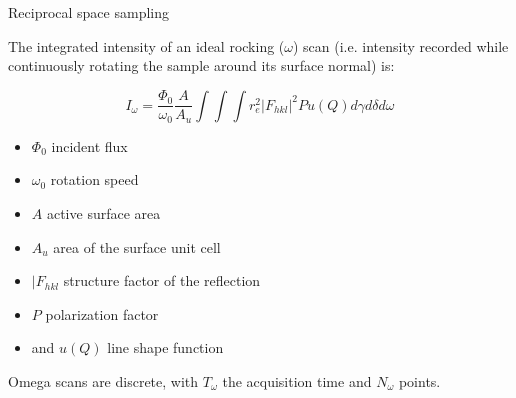 \begin{frame}{Reciprocal space sampling}

    The integrated intensity of an ideal rocking ($\omega$) scan (i.e. intensity recorded while continuously rotating the sample around its surface normal) is:
    
    \begin{equation}
        I_\omega = \frac{\Phi_0}{\omega_0} \frac{A}{A_u} \int \int \int r_e^2 |F_{hkl}|^2 P u(Q) d\gamma d\delta d\omega
    \end{equation}
    
    \begin{itemize}
        \item $\Phi_0$ incident flux
        \item $\omega_0$ rotation speed
        \item $A$ active surface area
        \item $A_u$ area of the surface unit cell
        \item $|F_{hkl}$ structure factor of the reflection
        \item $P$ polarization factor
        \item and $u(Q)$ line shape function \footnotemark
    \end{itemize}
    
    Omega scans are discrete, with $T_\omega$ the acquisition time and $N_\omega$ points.
    

\end{frame}


